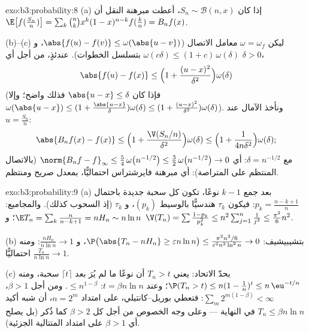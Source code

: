 \begin{solution}{exo:b3:probability:8}
(a) إذا كان $S_n \sim \mathcal B(n, x)$، أعطت مبرهنة النقل أن $\E\bigl[f(\frac{S_n}n)\bigr] =
\sum_k\binom nkx^k(1-x)^{n-k}f(\frac kn) = B_nf(x)$.

(b)--(c) ليكن $\omega = \omega_f$ معامل الاتصال ($\abs{f(u) - f(v)} \leq \omega(\abs{u - v})$، و $\omega(c
\delta) \leq (1 + c)\,\omega(\delta)$ بتسلسل
الخطوات). عندئذٍ، من أجل أي $\delta > 0$،
\[
\abs{f(u) - f(x)} \leq \Bigl(1 + \frac{(u -
x)^2}{\delta^2}\Bigr)\omega(\delta)
\]
(فإذا كان $\abs{u - x} \leq \delta$ فذلك واضح؛ وإلا $\omega(\abs{u-x}) \leq (1 + \frac{\abs{u-x}}\delta)
\omega(\delta) \leq (1 + \frac{(u-x)^2}{\delta^2})
\omega(\delta)$). ونأخذ الآمال عند
$u = \frac{S_n}n$:
\[
\abs{B_nf(x) - f(x)} \leq
\Bigl(1 + \frac{\V(S_n/n)}{\delta^2}\Bigr)\omega(\delta)
\leq \Bigl(1 + \frac{1}{4n\delta^2}\Bigr)\omega(\delta) ;
\]
مع $\delta = n^{-1/2}$: أي $\norm{B_nf - f}_\infty \leq
\frac54\,\omega\bigl(n^{-1/2}\bigr) \leq
\frac32\,\omega\bigl(n^{-1/2}\bigr) \to 0$ (بالاتصال المنتظم على المتراصة): أي مبرهنة
فايرشتراس احتماليًّا، بمعدل صريح ومنتظم.
\end{solution}

\begin{solution}{exo:b3:probability:9}
(a) بعد جمع $k - 1$ نوعًا، تكون كل سحبة جديدة باحتمال $p_k = \frac{n-k+1}n$:
فيكون $\tau_k$ هندسيًّا بالوسيط $(p_k)$، و $\tau_k$  (إذ
السحوب كذلك). والمجاميع: $\E T_n = \sum_k\frac n{n-k+1} = nH_n \sim n\ln n$؛ و $\V(T_n) = \sum\frac{1 - p_k}{p_k^2} \leq
n^2\sum_{j=1}^n\frac1{j^2} \leq \frac{\pi^2}6n^2$.

(b) بتشيبيشيف: $\P\bigl(\abs{T_n - nH_n} \geq \varepsilon
n\ln n\bigr) \leq \frac{\pi^2n^2/6}{\varepsilon^2n^2\ln^2n}
\to 0$، و $\frac{nH_n}{n\ln n} \to 1$: ومنه $\frac{T_n}{n\ln n}
\to 1$ احتماليًّا.

(c) بحدّ الاتحاد: يعني $T_n > t$ أن نوعًا ما لم يُرَ بعد
$\lceil t\rceil$ سحبة، ومنه $\P(T_n > t) \leq n(1 -
\frac1n)^{t} \leq n\,\eu^{-t/n}$؛ وعند $t = \beta n\ln n$: $\leq n^{1 - \beta}$. ومن
أجل $\beta > 1$، $\sum_m
2^{m(1-\beta)} < \infty$: فتعطي بوريل--كانتيلي، على امتداد
$n =
2^m$، أن شبه أكيد $T_n \leq \beta n\ln n$ في النهاية --- وعلى وجه الخصوص من
أجل كل $\beta > 2$ كما ذُكر (بل يصلح أي $\beta > 1$ على امتداد
المتتالية الجزئية).
\end{solution}

